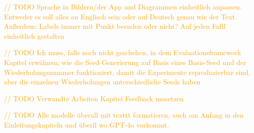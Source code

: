 \textcolor{orange}{// TODO Sprache in Bildern/der App und Diagrammen einheitlich anpassen. Entweder es soll alles au Englisch sein oder auf Deutsch genau wie der Text. Außerdem: Labels immer mit Punkt beenden oder nicht? Auf jeden Falll einheitlich gestalten}

\textcolor{orange}{// TODO Ich muss, falls noch nicht geschehen, in dem Evaluationsframework Kapitel erwähnen, wie die Seed-Generierung auf Basis eines Basis-Seed und der Wiederholungsnummer funktioniert, damit die Experimente reproduzierbar sind, aber die einzelnen Wiederholungen unterschiedliche Seeds haben}

\textcolor{orange}{// TODO Verwandte Arbeiten Kapitel Feedback umsetzen}

\textcolor{orange}{// TODO Alle modelle überall mit texttt formatieren, auch am Anfang in den Einleitungskapiteln und überll wo GPT-4o vorkommt.}













